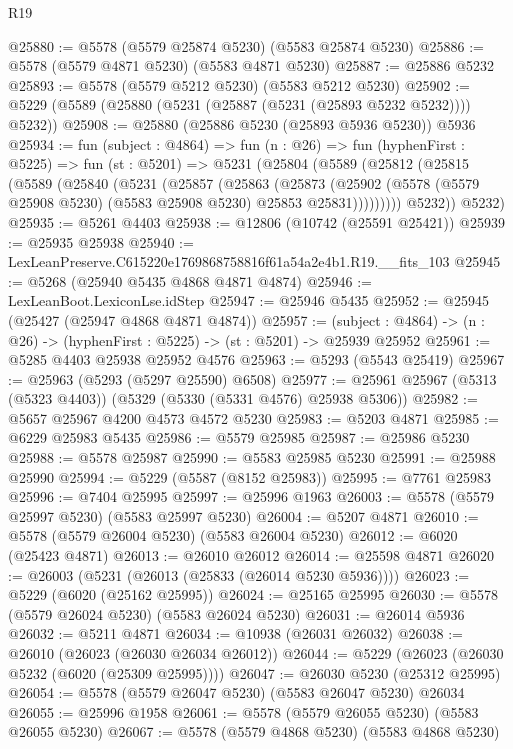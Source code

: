 \begin{lexlean}{R19}
\begin{coremodule}
@25880 := @5578 (@5579 @25874 @5230) (@5583 @25874 @5230)
@25886 := @5578 (@5579 @4871 @5230) (@5583 @4871 @5230)
@25887 := @25886 @5232
@25893 := @5578 (@5579 @5212 @5230) (@5583 @5212 @5230)
@25902 := @5229 (@5589 (@25880 (@5231 (@25887 (@5231 (@25893 @5232 @5232)))) @5232))
@25908 := @25880 (@25886 @5230 (@25893 @5936 @5230)) @5936
@25934 := fun (subject : @4864) =>
  fun (n : @26) =>
  fun (hyphenFirst : @5225) =>
  fun (st : @5201) =>
  @5231
    (@25804
      (@5589
        (@25812
          (@25815
            (@5589
              (@25840
                (@5231
                  (@25857
                    (@25863
                      (@25873
                        (@25902
                          (@5578 (@5579 @25908 @5230) (@5583 @25908 @5230) @25853 @25831)))))))))
          @5232))
      @5232)
@25935 := @5261 @4403
@25938 := @12806 (@10742 (@25591 @25421))
@25939 := @25935 @25938
@25940 := LexLeanPreserve.C615220e1769868758816f61a54a2e4b1.R19.__fits_103
@25945 := @5268 (@25940 @5435 @4868 @4871 @4874)
@25946 := LexLeanBoot.LexiconLse.idStep
@25947 := @25946 @5435
@25952 := @25945 (@25427 (@25947 @4868 @4871 @4874))
@25957 := (subject : @4864) -> (n : @26) -> (hyphenFirst : @5225) -> (st : @5201) -> @25939 @25952
@25961 := @5285 @4403 @25938 @25952 @4576
@25963 := @5293 (@5543 @25419)
@25967 := @25963 (@5293 (@5297 @25590) @6508)
@25977 := @25961 @25967 (@5313 (@5323 @4403)) (@5329 (@5330 (@5331 @4576) @25938 @5306))
@25982 := @5657 @25967 @4200 @4573 @4572 @5230
@25983 := @5203 @4871
@25985 := @6229 @25983 @5435
@25986 := @5579 @25985
@25987 := @25986 @5230
@25988 := @5578 @25987
@25990 := @5583 @25985 @5230
@25991 := @25988 @25990
@25994 := @5229 (@5587 (@8152 @25983))
@25995 := @7761 @25983
@25996 := @7404 @25995
@25997 := @25996 @1963
@26003 := @5578 (@5579 @25997 @5230) (@5583 @25997 @5230)
@26004 := @5207 @4871
@26010 := @5578 (@5579 @26004 @5230) (@5583 @26004 @5230)
@26012 := @6020 (@25423 @4871)
@26013 := @26010 @26012
@26014 := @25598 @4871
@26020 := @26003 (@5231 (@26013 (@25833 (@26014 @5230 @5936))))
@26023 := @5229 (@6020 (@25162 @25995))
@26024 := @25165 @25995
@26030 := @5578 (@5579 @26024 @5230) (@5583 @26024 @5230)
@26031 := @26014 @5936
@26032 := @5211 @4871
@26034 := @10938 (@26031 @26032)
@26038 := @26010 (@26023 (@26030 @26034 @26012))
@26044 := @5229 (@26023 (@26030 @5232 (@6020 (@25309 @25995))))
@26047 := @26030 @5230 (@25312 @25995)
@26054 := @5578 (@5579 @26047 @5230) (@5583 @26047 @5230) @26034
@26055 := @25996 @1958
@26061 := @5578 (@5579 @26055 @5230) (@5583 @26055 @5230)
@26067 := @5578 (@5579 @4868 @5230) (@5583 @4868 @5230)

\end{coremodule}
\end{lexlean}
